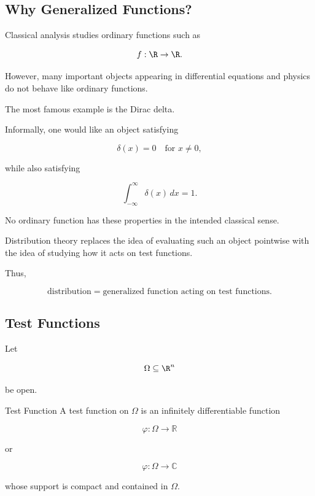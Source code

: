 \subsection{Why Generalized Functions?}
\label{subsec:why-generalized-functions}

Classical analysis studies ordinary functions such as

\[
f:\R\to\R.
\]

However, many important objects appearing in differential equations and
physics do not behave like ordinary functions.

The most famous example is the Dirac delta.

Informally, one would like an object satisfying

\[
\boxed{
\delta(x)=0
\quad\text{for }x\neq0,
}
\]

while also satisfying

\[
\boxed{
\int_{-\infty}^{\infty}
\delta(x)\,dx
=
1.
}
\]

No ordinary function has these properties in the intended classical
sense.

Distribution theory replaces the idea of evaluating such an object
pointwise with the idea of studying how it acts on test functions.

Thus,

\[
\boxed{
\text{distribution}
=
\text{generalized function acting on test functions}.
}
\]

\subsection{Test Functions}
\label{subsec:distribution-test-functions}

Let

\[
\Omega\subseteq\R^n
\]

be open.

\begin{definitionbox}{Test Function}
A test function on \(\Omega\) is an infinitely differentiable function

\[
\varphi:\Omega\to\mathbb{R}
\]

or

\[
\varphi:\Omega\to\mathbb{C}
\]

whose support is compact and contained in \(\Omega\).
\end{definitionbox}

